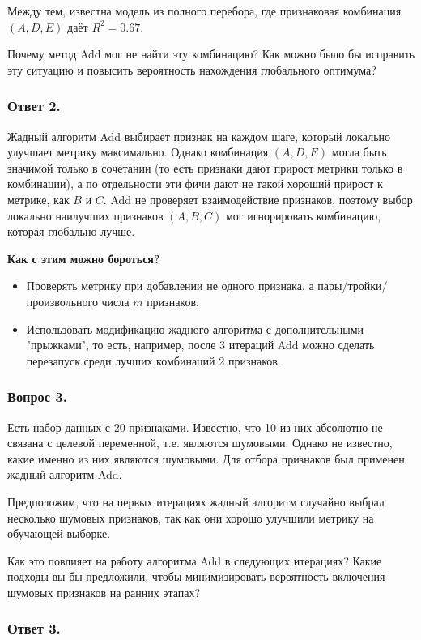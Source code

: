Между тем, известна модель из полного перебора, где признаковая комбинация $({A, D, E})$ даёт $R^2 = 0.67$.

Почему метод Add мог не найти эту комбинацию? Как можно было бы исправить эту ситуацию и повысить вероятность нахождения глобального оптимума?

\subsubsection{Ответ 2.}

Жадный алгоритм Add выбирает признак на каждом шаге, который локально улучшает метрику максимально. Однако комбинация $({A, D, E})$ могла быть значимой только в сочетании (то есть признаки дают прирост метрики только в комбинации), а по отдельности эти фичи дают не такой хороший прирост к метрике, как $B$ и $C$. Add не проверяет взаимодействие признаков, поэтому выбор локально наилучших признаков $({A, B, C})$ мог игнорировать комбинацию, которая глобально лучше.

\textbf{Как с этим можно бороться?}
\begin{itemize}
    \item Проверять метрику при добавлении не одного признака, а пары/тройки/произвольного числа $m$ признаков.
    \item Использовать модификацию жадного алгоритма с дополнительными "прыжками", то есть, например, после 3 итераций Add можно сделать перезапуск среди лучших комбинаций 2 признаков.
\end{itemize}

\subsubsection{Вопрос 3.}

Есть набор данных с 20 признаками. Известно, что 10 из них абсолютно не связана с целевой переменной, т.е. являются шумовыми. Однако не известно, какие именно из них являются шумовыми. Для отбора признаков был применен жадный алгоритм Add.

Предположим, что на первых итерациях жадный алгоритм случайно выбрал несколько шумовых признаков, так как они хорошо улучшили метрику на обучающей выборке.

Как это повлияет на работу алгоритма Add в следующих итерациях? Какие подходы вы бы предложили, чтобы минимизировать вероятность включения шумовых признаков на ранних этапах?

\subsubsection{Ответ 3.}\

